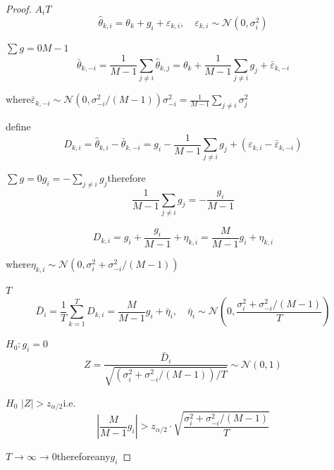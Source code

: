 \documentclass[12pt,a4paper]{article}
\theoremstyle{remark}
\newcommand{\sumgeq}{\sum g = 0}
\begin{document}
\begin{proof}
$A_i$$T$
\begin{equation}
    \hat{\theta}_{k,i} = \theta_k + g_i + \varepsilon_{k,i}, \quad \varepsilon_{k,i} \sim \mathcal{N}(0, \sigma_i^2)
\end{equation}

$\sumgeq$$M-1$
\begin{equation}
    \bar{\theta}_{k,-i} = \frac{1}{M-1}\sum_{j \neq i} \hat{\theta}_{k,j} = \theta_k + \frac{1}{M-1}\sum_{j \neq i} g_j + \bar{\varepsilon}_{k,-i}
\end{equation}

where$\bar{\varepsilon}_{k,-i} \sim \mathcal{N}(0, \sigma_{-i}^2/(M-1))$$\sigma_{-i}^2 = \frac{1}{M-1}\sum_{j \neq i}\sigma_j^2$

define
\begin{equation}
    D_{k,i} = \hat{\theta}_{k,i} - \bar{\theta}_{k,-i} = g_i - \frac{1}{M-1}\sum_{j \neq i} g_j + (\varepsilon_{k,i} - \bar{\varepsilon}_{k,-i})
\end{equation}

$\sumgeq$$g_i = -\sum_{j \neq i} g_j$therefore
\begin{equation}
    \frac{1}{M-1}\sum_{j \neq i} g_j = -\frac{g_i}{M-1}
\end{equation}


\begin{equation}
    D_{k,i} = g_i + \frac{g_i}{M-1} + \eta_{k,i} = \frac{M}{M-1}g_i + \eta_{k,i}
\end{equation}

where$\eta_{k,i} \sim \mathcal{N}(0, \sigma_i^2 + \sigma_{-i}^2/(M-1))$

$T$
\begin{equation}
    \bar{D}_i = \frac{1}{T}\sum_{k=1}^{T} D_{k,i} = \frac{M}{M-1}g_i + \bar{\eta}_i, \quad \bar{\eta}_i \sim \mathcal{N}\left(0, \frac{\sigma_i^2 + \sigma_{-i}^2/(M-1)}{T}\right)
\end{equation}

$H_0: g_i = 0$ 
\begin{equation}
    Z = \frac{\bar{D}_i}{\sqrt{(\sigma_i^2 + \sigma_{-i}^2/(M-1))/T}} \sim \mathcal{N}(0,1)
\end{equation}

$H_0$ $|Z| > z_{\alpha/2}$i.e.
\begin{equation}
    \left|\frac{M}{M-1}g_i\right| > z_{\alpha/2} \cdot \sqrt{\frac{\sigma_i^2 + \sigma_{-i}^2/(M-1)}{T}}
\end{equation}

$T \to \infty$$\to 0$thereforeany$g_i$
\end{proof}
\end{document}
